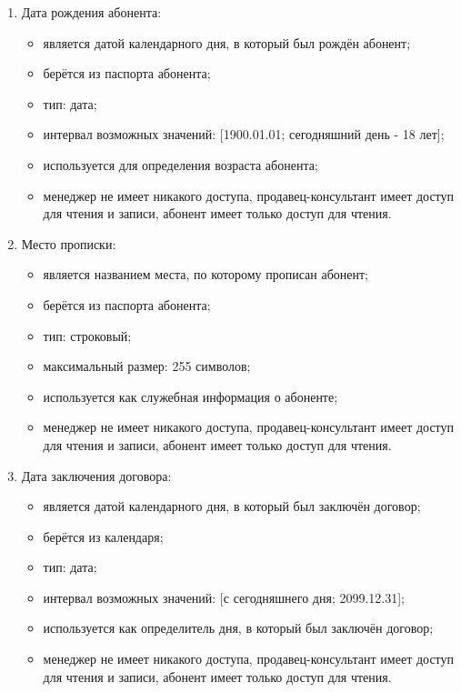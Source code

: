 \begin{enumerate}
\begin{enumerate}
        \item Дата рождения абонента:
        \begin{itemize}
            \item является датой календарного дня, в который был рождён абонент;
            \item берётся из паспорта абонента;
            \item тип: дата;
            \item интервал возможных значений: [1900.01.01; сегодняшний день - 18 лет];
            \item используется для определения возраста абонента;
            \item менеджер не имеет никакого доступа, продавец-консультант имеет доступ для чтения и записи, абонент имеет только доступ для чтения.
        \end{itemize}

        \item Место прописки:
        \begin{itemize}
            \item является названием места, по которому прописан абонент;
            \item берётся из паспорта абонента;
            \item тип: строковый;
            \item максимальный размер: 255 символов;
            \item используется как служебная информация о абоненте;
            \item менеджер не имеет никакого доступа, продавец-консультант имеет доступ для чтения и записи, абонент имеет только доступ для чтения.
        \end{itemize}

        \item Дата заключения договора:
        \begin{itemize}
            \item является датой календарного дня, в который был заключён договор;
            \item берётся из календаря;
            \item тип: дата;
            \item интервал возможных значений: [с сегодняшнего дня; 2099.12.31];
            \item используется как определитель дня, в который был заключён договор;
            \item менеджер не имеет никакого доступа, продавец-консультант имеет доступ для чтения и записи, абонент имеет только доступ для чтения.
        \end{itemize}


\end{enumerate}
\end{enumerate}

